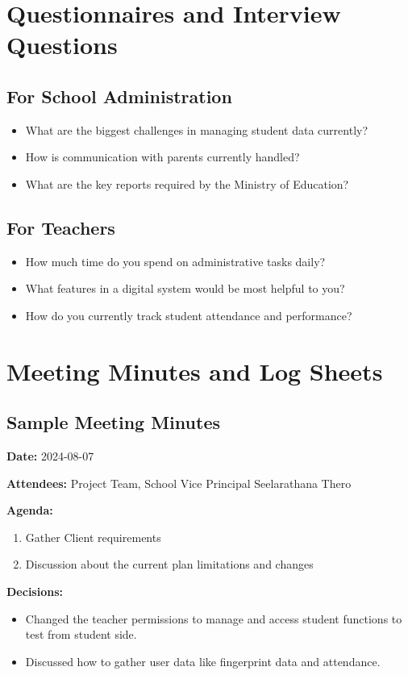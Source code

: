 \documentclass[12pt,a4paper]{report}
\begin{document}
\section{Questionnaires and Interview Questions}
\subsection{For School Administration}
\begin{itemize}
    \item What are the biggest challenges in managing student data currently?
    \item How is communication with parents currently handled?
    \item What are the key reports required by the Ministry of Education?
\end{itemize}

\subsection{For Teachers}
\begin{itemize}
    \item How much time do you spend on administrative tasks daily?
    \item What features in a digital system would be most helpful to you?
    \item How do you currently track student attendance and performance?
\end{itemize}

\section{Meeting Minutes and Log Sheets}
\subsection{Sample Meeting Minutes}
\textbf{Date:} 2024-08-07

\textbf{Attendees:} Project Team, School Vice Principal Seelarathana Thero

\textbf{Agenda:}
\begin{enumerate}
    \item Gather Client requirements
    \item Discussion about the current plan limitations and changes
\end{enumerate}

\textbf{Decisions:}
\begin{itemize}
    \item Changed the teacher permissions to manage and access student functions to test from student side.
    \item Discussed how to gather user data like fingerprint data and attendance.
\end{itemize}
\end{document}
